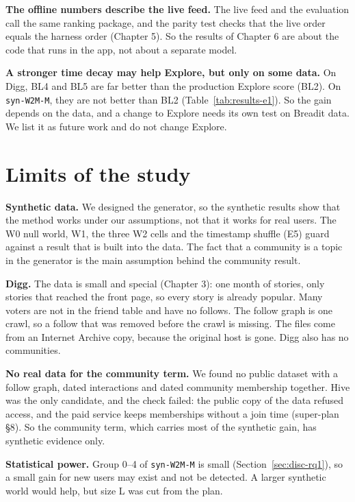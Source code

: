 \textbf{The offline numbers describe the live feed.} The live feed and the evaluation call the same ranking package, and the parity test checks that the live order equals the harness order (Chapter 5). So the results of Chapter 6 are about the code that runs in the app, not about a separate model.

\textbf{A stronger time decay may help Explore, but only on some data.} On Digg, BL4 and BL5 are far better than the production Explore score (BL2). On \texttt{syn-W2M-M}, they are not better than BL2 (Table~\ref{tab:results-e1}). So the gain depends on the data, and a change to Explore needs its own test on Breadit data. We list it as future work and do not change Explore.

\section{Limits of the study}
\label{sec:disc-limits}

\textbf{Synthetic data.} We designed the generator, so the synthetic results show that the method works under our assumptions, not that it works for real users. The W0 null world, W1, the three W2 cells and the timestamp shuffle (E5) guard against a result that is built into the data. The fact that a community is a topic in the generator is the main assumption behind the community result.

\textbf{Digg.} The data is small and special (Chapter 3): one month of stories, only stories that reached the front page, so every story is already popular. Many voters are not in the friend table and have no follows. The follow graph is one crawl, so a follow that was removed before the crawl is missing. The files come from an Internet Archive copy, because the original host is gone. Digg also has no communities.

\textbf{No real data for the community term.} We found no public dataset with a follow graph, dated interactions and dated community membership together. Hive was the only candidate, and the check failed: the public copy of the data refused access, and the paid service keeps memberships without a join time (super-plan \S 8). So the community term, which carries most of the synthetic gain, has synthetic evidence only.

\textbf{Statistical power.} Group 0--4 of \texttt{syn-W2M-M} is small (Section~\ref{sec:disc-rq1}), so a small gain for new users may exist and not be detected. A larger synthetic world would help, but size L was cut from the plan.

